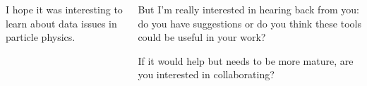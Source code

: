 \documentclass[aspectratio=169]{beamer}
\begin{document}
\begin{frame}{}
\large
\begin{columns}[t]
\begin{center}
I hope it was interesting to learn about data issues in particle physics.
\end{center}

\begin{center}
But I'm really interested in hearing back from you: do you have suggestions or do you think these tools could be useful in your work?

\vspace{0.5 cm}
If it would help but needs to be more mature, are you interested in collaborating?

\vspace{0.5 cm}
\end{center}

\end{columns}
\end{frame}
\end{document}
